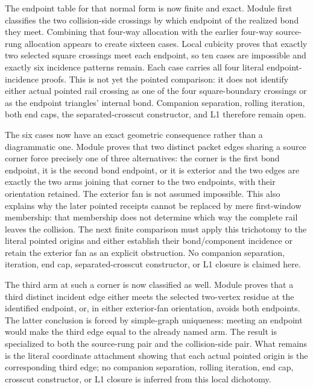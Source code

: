 \documentclass[11pt]{article}
\theoremstyle{definition}
\begin{document}
The endpoint table for that normal form is now finite and exact.  Module
first classifies the two collision-side crossings by which endpoint of the
realized bond they meet.  Combining that four-way allocation with the earlier
four-way source-rung allocation appears to create sixteen cases.  Local
cubicity proves that exactly two selected square crossings meet each endpoint,
so ten cases are impossible and exactly six incidence patterns remain.  Each
case carries all four literal endpoint-incidence proofs.  This is not yet the
pointed comparison: it does not identify either actual pointed rail crossing
as one of the four square-boundary crossings or as the endpoint triangles'
internal bond.  Companion separation, rolling iteration, both end caps, the
separated-crosscut constructor, and L1 therefore remain open.

The six cases now have an exact geometric consequence rather than a diagrammatic
one.  Module
proves that two distinct packet edges sharing a source corner force precisely
one of three alternatives: the corner is the first bond endpoint, it is the
second bond endpoint, or it is exterior and the two edges are exactly the two
arms joining that corner to the two endpoints, with their orientation retained.
The exterior fan is not assumed impossible.  This also explains why the later
pointed receipts cannot be replaced by mere first-window membership: that
membership does not determine which way the complete rail leaves the collision.
The next finite comparison must apply this trichotomy to the literal pointed
origins and either establish their bond/component incidence or retain the
exterior fan as an explicit obstruction.  No companion separation, iteration,
end cap, separated-crosscut constructor, or L1 closure is claimed here.

The third arm at such a corner is now classified as well.  Module
proves that a third distinct incident edge either meets the selected
two-vertex residue at the identified endpoint, or, in either exterior-fan
orientation, avoids both endpoints.  The latter conclusion is forced by
simple-graph uniqueness: meeting an endpoint would make the third edge equal
to the already named arm.  The result is specialized to both the source-rung
pair and the collision-side pair.  What remains is the literal coordinate
attachment showing that each actual pointed origin is the corresponding third
edge; no companion separation, rolling iteration, end cap, crosscut
constructor, or L1 closure is inferred from this local dichotomy.
\end{document}
